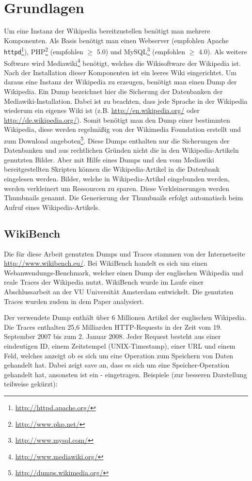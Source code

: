 \section{Grundlagen}
\label{sec:grundlagen}

Um eine Instanz der Wikipedia bereitzustellen benötigt man mehrere Komponenten. Als Basis benötigt man einen Webserver (empfohlen Apache \texttt{httpd}\footnote{\url{http://httpd.apache.org/}}), PHP\footnote{\url{http://www.php.net/}} (empfohlen $\geq$ 5.0) und MySQL\footnote{\url{http://www.mysql.com/}} (empfohlen $\geq$ 4.0). Als weitere Software wird Mediawiki\footnote{\url{http://www.mediawiki.org/}} benötigt, welches die Wikisoftware der Wikipedia ist. Nach der Installation dieser Komponenten ist ein leeres Wiki eingerichtet. Um daraus eine Instanz der Wikipedia zu erzeugen, benötigt man einen Dump der Wikipedia. Ein Dump bezeichnet hier die Sicherung der Datenbanken der Mediawiki-Installation. Dabei ist zu beachten, dass jede Sprache in der Wikipedia wiederum ein eigenes Wiki ist (z.B. \url{http://en.wikipedia.org/} oder \url{http://de.wikipedia.org/}). Somit benötigt man den Dump einer bestimmten Wikipedia, diese werden regelmäßig von der Wikimedia Foundation erstellt und zum Download angeboten\footnote{\url{http://dumps.wikimedia.org/}}. Diese Dumps enthalten nur die Sicherungen der Datenbanken und aus rechtlichen Gründen nicht die in den Wikipedia-Artikeln genutzten Bilder. Aber mit Hilfe eines Dumps und den vom Mediawiki bereitgestellten Skripten können die Wikipedia-Artikel in die Datenbank eingelesen werden. Bilder, welche in Wikipedia-Artikel eingebunden werden, werden verkleinert um Ressourcen zu sparen. Diese Verkleinerungen werden Thumbnails genannt. Die Generierung der Thumbnails erfolgt automatisch beim Aufruf eines Wikipedia-Artikels.

\subsection{WikiBench}
\label{sec:wikibench}

Die für diese Arbeit genutzten Dumps und Traces stammen von der Internetseite \url{http://www.wikibench.eu/}. Bei WikiBench handelt es sich um einen Webanwendungs-Benchmark, welcher einen Dump der englischen Wikipedia und reale Traces der Wikipedia nutzt. WikiBench wurde im Laufe einer Abschlussarbeit \cite{wikibench} an der VU Universität Amsterdam entwickelt. Die genutzten Traces wurden zudem in dem Paper \cite{wikianal} analysiert.

Der verwendete Dump enthält über 6 Millionen Artikel der englischen Wikipedia. Die Traces enthalten 25,6 Milliarden HTTP-Requests in der Zeit vom 19. September 2007 bis zum 2. Januar 2008. Jeder Request besteht aus einer eindeutigen ID, einem Zeitstempel (UNIX-Timestamp), einer URL und einem Feld, welches anzeigt ob es sich um eine Operation zum Speichern von Daten gehandelt hat. Dabei zeigt \glqq{}save\grqq{} an, dass es sich um eine Speicher-Operation gehandelt hat, ansonsten ist ein \glqq{}-\grqq{} eingetragen. Beispiele (zur besseren Darstellung teilweise gekürzt):

